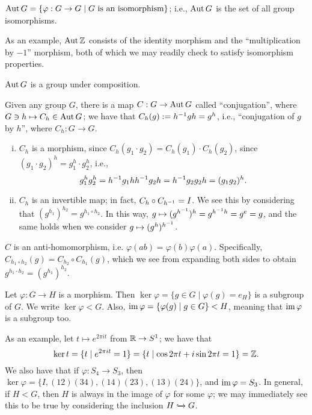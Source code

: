 \begin{definition}
    $\operatorname{Aut} G = \{\varphi : G \to G \mid G \text{ is an isomorphism}\}$; i.e., $\operatorname{Aut} G$ is the set of all group isomorphisms.
\end{definition}
\noindent As an example, $\operatorname{Aut} \mathbb Z$ consists of the identity morphism and the ``multiplication by $-1$'' morphism, both of which we may readily check to satisfy isomorphism properties.
\begin{claim}
    $\operatorname{Aut} G$ is a group under composition.
\end{claim}
\noindent Given any group $G$, there is a map $C : G \to \operatorname{Aut} G$ called ``conjugation'', where $G \ni h \mapsto C_h \in \operatorname{Aut} G$; we have that $C_h(g) := h^{-1} g h = g^h$, i.e., ``conjugation of $g$ by $h$'', where $C_h : G \to G$.
\begin{enumerate}[(i)]
    \item $C_h$ is a morphism, since $C_h(g_1 \cdot g_2) = C_h (g_1) \cdot C_h(g_2)$, since $(g_1 \cdot g_2)^h = g_1^h \cdot g_2^h$, i.e.,
    \[ g_1^h g_2^h = h ^{-1} g_1 h h ^{-1} g_2 h = h ^{-1} g_2 g_2 h = (g_1 g_2)^h. \]
    \item $C_h$ is an invertible map; in fact, $C_h \circ C_{h ^{-1}} = I$. We see this by considering that $(g^{h_1})^{h_2} = g^{h_1 \circ h_2}$. In this way, $g \mapsto (g^{h ^{-1}})^h = g^{h^{-1} h} = g^e = g$, and the same holds when we consider $g \mapsto (g^h)^{h ^{-1}}$.
\end{enumerate}
\begin{claim}
    $C$ is an anti-homomorphism, i.e. $\varphi(ab) = \varphi(b) \varphi(a)$. Specifically, $C_{h_1 \circ h_2}(g) = C_{h_2} \circ C_{h_1}(g)$, which we see from expanding both sides to obtain $g^{h_1 \cdot h_2} = (g^{h_1})^{h_2}$.
\end{claim}
\begin{claim}
    Let $\varphi : G \to H$ is a morphism. Then $\ker \varphi = \{g \in G \mid \varphi(g) = e_H\}$ is a subgroup of $G$. We write $\ker \varphi < G$. Also, $\operatorname{im} \varphi = \{\varphi(g) \mid g \in G\} < H$, meaning that $\operatorname{im} \varphi$ is a subgroup too.
\end{claim}
\noindent As an example, let $t \mapsto e^{2\pi i t}$ from $\mathbb R \to S^1$; we have that
\[ \ker t = \{t \mid e^{2 \pi i t} = 1\} = \{t \mid \cos 2\pi t + i \sin 2\pi t = 1\} = \mathbb Z. \]
We also have that if $\varphi : S_4 \to S_3$, then $\ker \varphi = \{I, (1 2)(3 4), (1 4)(2 3), (1 3)(2 4)\}$, and $\operatorname{im} \varphi = S_3$. In general, if $H < G$, then $H$ is always in the image of $\varphi$ for some $\varphi$; we may immediately see this to be true by considering the inclusion $H \xhookrightarrow{} G$.
